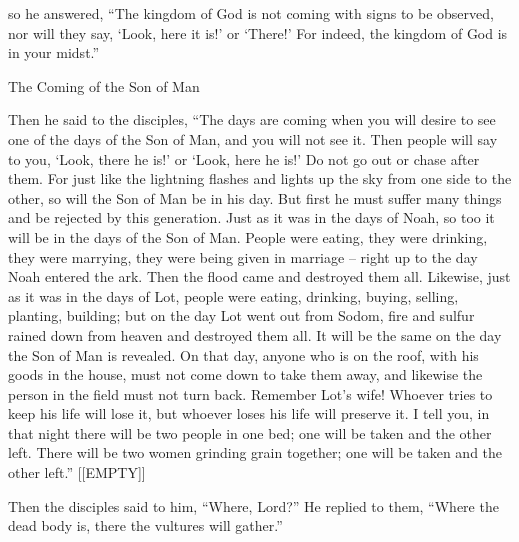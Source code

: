 {so he answered,
“The kingdom
of God
is
not
coming
with
signs to be observed,
nor
will they say,
‘Look,
here
it is!’ or
‘There!’ For
indeed,
the kingdom
of God
is
in
your
midst.”
\par }{\SH The Coming of the Son of Man
\par }{\PP {}Then
he said
to
the disciples,
“The days
are coming
when
you will desire
to see
one
of the days
of the Son
of Man,
and
you will
not
see it.
Then
people will say
to you,
‘Look,
there
he is!’ or
‘Look,
here
he is!’ Do
not
go out
or
chase after them.
For
just like
the lightning
flashes
and lights up
the sky
from
one side to
the other,
so
will
the Son
of Man be in his day.
But
first
he must
suffer
many things
and
be rejected
by
this
generation.
Just as
it was
in
the days
of Noah,
so
too
it will be
in
the days
of the Son
of Man.
People were eating,
they were drinking,
they were marrying,
they were being given in marriage
– right up to
the day
Noah
entered
the ark.
Then
the flood
came
and
destroyed
them all.
Likewise,
just
as it was
in
the days
of Lot,
people were eating,
drinking,
buying,
selling,
planting,
building;
but
on the day
Lot
went out
from
Sodom,
fire
and
sulfur
rained down
from
heaven
and
destroyed
them all.
It will be
the same on the day
the Son
of Man
is revealed.
On
that
day,
anyone who
is
on
the roof,
with his
goods
in
the house,
must
not
come down
to take
them
away,
and
likewise
the person in
the field
must
not
turn
back.
Remember
Lot’s
wife!
Whoever
tries
to keep
his
life
will lose
it,
but
whoever
loses
his life will preserve
it.
I tell
you,
in that
night
there will be
two
people in
one
bed;
one
will be taken
and
the other
left.
There will be
two
women grinding grain
together;
one
will be taken
and
the other
left.”
[[EMPTY]]
\par }{\PP {}Then
the disciples
said
to him,
“Where,
Lord?” He replied
to them,
“Where
the dead body
is, there
the vultures
will gather.”

}
